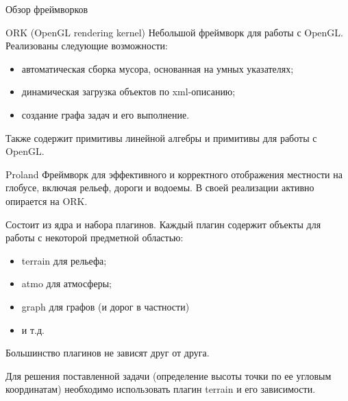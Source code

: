 \documentclass[12pt]{article}
\begin{document}
\begin{section}{Обзор фреймворков}
\begin{subsection}{ORK (OpenGL rendering kernel)}
Небольшой фреймворк для работы с OpenGL.
Реализованы следующие возможности:
\begin{itemize}
    \item автоматическая сборка мусора, основанная на умных указателях;
    \item динамическая загрузка объектов по xml-описанию;
    \item создание графа задач и его выполнение.
\end{itemize}

Также содержит примитивы линейной алгебры и примитивы для работы с OpenGL.
\end{subsection}

\begin{subsection}{Proland}
Фреймворк для эффективного и корректного отображения местности на глобусе, включая рельеф, дороги и водоемы. В своей реализации активно опирается на ORK.

Состоит из ядра и набора плагинов. Каждый плагин содержит объекты для работы с некоторой предметной областью:
\begin{itemize}
    \item terrain для рельефа;
    \item atmo для атмосферы;
    \item graph для графов (и дорог в частности)
    \item и т.д.
\end{itemize}
Большинство плагинов не зависят друг от друга.

Для решения поставленной задачи (определение высоты точки по ее угловым координатам) необходимо использовать плагин terrain и его зависимости.
\end{subsection}
\end{section}
\end{document}
